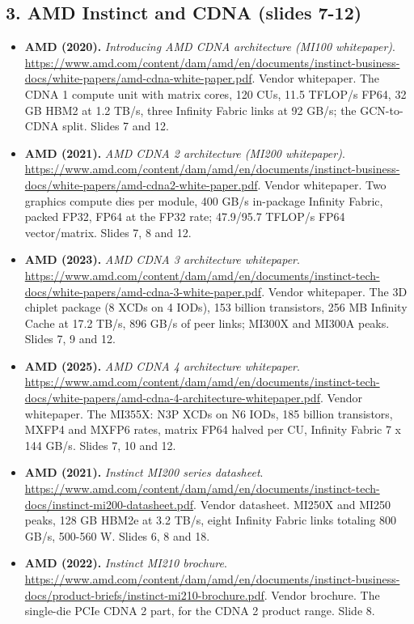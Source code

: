 \documentclass[11pt,letterpaper]{article}
\begin{document}
\subsection*{3. AMD Instinct and CDNA (slides 7-12)}
\begin{itemize}[leftmargin=1.2em,itemsep=3pt]\sloppy
\item \textbf{AMD (2020).} \textit{Introducing AMD CDNA architecture (MI100 whitepaper)}. \url{https://www.amd.com/content/dam/amd/en/documents/instinct-business-docs/white-papers/amd-cdna-white-paper.pdf}. Vendor whitepaper. The CDNA 1 compute unit with matrix cores, 120 CUs, 11.5 TFLOP/s FP64, 32 GB HBM2 at 1.2 TB/s, three Infinity Fabric links at 92 GB/s; the GCN-to-CDNA split. Slides 7 and 12.
\item \textbf{AMD (2021).} \textit{AMD CDNA 2 architecture (MI200 whitepaper)}. \url{https://www.amd.com/content/dam/amd/en/documents/instinct-business-docs/white-papers/amd-cdna2-white-paper.pdf}. Vendor whitepaper. Two graphics compute dies per module, 400 GB/s in-package Infinity Fabric, packed FP32, FP64 at the FP32 rate; 47.9/95.7 TFLOP/s FP64 vector/matrix. Slides 7, 8 and 12.
\item \textbf{AMD (2023).} \textit{AMD CDNA 3 architecture whitepaper}. \url{https://www.amd.com/content/dam/amd/en/documents/instinct-tech-docs/white-papers/amd-cdna-3-white-paper.pdf}. Vendor whitepaper. The 3D chiplet package (8 XCDs on 4 IODs), 153 billion transistors, 256 MB Infinity Cache at 17.2 TB/s, 896 GB/s of peer links; MI300X and MI300A peaks. Slides 7, 9 and 12.
\item \textbf{AMD (2025).} \textit{AMD CDNA 4 architecture whitepaper}. \url{https://www.amd.com/content/dam/amd/en/documents/instinct-tech-docs/white-papers/amd-cdna-4-architecture-whitepaper.pdf}. Vendor whitepaper. The MI355X: N3P XCDs on N6 IODs, 185 billion transistors, MXFP4 and MXFP6 rates, matrix FP64 halved per CU, Infinity Fabric 7 x 144 GB/s. Slides 7, 10 and 12.
\item \textbf{AMD (2021).} \textit{Instinct MI200 series datasheet}. \url{https://www.amd.com/content/dam/amd/en/documents/instinct-tech-docs/instinct-mi200-datasheet.pdf}. Vendor datasheet. MI250X and MI250 peaks, 128 GB HBM2e at 3.2 TB/s, eight Infinity Fabric links totaling 800 GB/s, 500-560 W. Slides 6, 8 and 18.
\item \textbf{AMD (2022).} \textit{Instinct MI210 brochure}. \url{https://www.amd.com/content/dam/amd/en/documents/instinct-business-docs/product-briefs/instinct-mi210-brochure.pdf}. Vendor brochure. The single-die PCIe CDNA 2 part, for the CDNA 2 product range. Slide 8.

\end{itemize}
\end{document}
